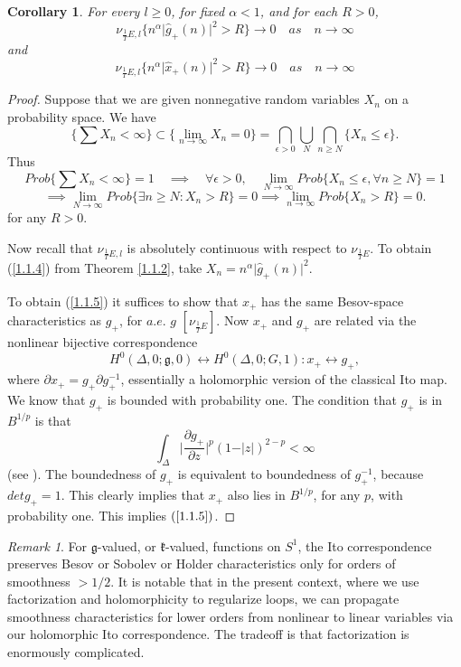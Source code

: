 \documentclass{amsart}
\newtheorem{corollary}{Corollary}
\theoremstyle{conjecture}
\theoremstyle{definition}
\theoremstyle{question}
\theoremstyle{questions}
\theoremstyle{remark}
\newtheorem*{remark}{Remark}
\theoremstyle{remarks}
\theoremstyle{example}
\numberwithin{equation}{section}
\begin{document}
\begin{corollary}\label{1.1.3} For every $l\ge 0$, for fixed
$\alpha <1$, and for each $R>0$,
\begin{equation}\label{1.1.4}\nu_{\frac 1T E ,l}\{n^{\alpha}\vert\hat {g}_{+}(n)\vert^2>R\}\to 0\quad
as\quad n\to\infty \end{equation}
and
\begin{equation}\label{1.1.5}\nu_{\frac 1T E ,l}\{n^{\alpha}\vert\hat {x}_{+}(n)\vert^2>R\}\to 0\quad
as\quad n\to\infty \end{equation}
\end{corollary}

\begin{proof}  Suppose that we are given
nonnegative random variables $X_n$ on a probability space.
We have
$$\{\sum X_n<\infty \}\subset \{\lim_{n\to\infty}X_n=0\}=\bigcap_{
\epsilon >0}\bigcup_N\bigcap_{n\ge N}\{X_n\le\epsilon \}.$$
Thus
$$Prob\{\sum X_n<\infty \}=1\quad\implies\quad\forall\epsilon >0,
\quad\lim_{N\to\infty}Prob\{X_n\le\epsilon ,\forall n\ge N\}=1$$
$$\implies\lim_{N\to\infty}Prob\{\exists n\ge N:X_n>R\}=0\implies\lim_{
n\to\infty}Prob\{X_n>R\}=0.$$
for any $R>0$.

Now recall that $\nu_{\frac 1T E ,l}$ is absolutely continuous with
respect to $\nu_{\frac 1T E}$.  To obtain (\ref{1.1.4}) from Theorem \ref{1.1.2}, take
$X_n=n^{\alpha}\vert\hat {g}_{+}(n)\vert^2$.

To obtain (\ref{1.1.5}) it suffices to show that $x_{+}$ has the same
Besov-space characteristics as $g_{+}$, for $a.e.$ $g$ $[\nu_{\frac 1T E}]$.
Now $x_{+}$ and $g_{+}$ are related via the nonlinear bijective
correspondence
$$H^0(\Delta ,0;\mathfrak g,0)\leftrightarrow H^0(\Delta ,0;G,1):x_{+}
\leftrightarrow g_{+},$$
where $\partial x_{+}=g_{+}\partial g_{+}^{-1}$, essentially a holomorphic version of
the classical Ito map.  We know that $g_{+}$ is bounded with
probability one.  The condition that $g_{+}$ is in $B^{1/p}$ is that
$$\int_{\Delta}\vert\frac {\partial g_{+}}{\partial z}\vert^p(1-\vert
z\vert )^{2-p}<\infty$$
(see \cite{Peller}).  The boundedness of $g_{+}$ is equivalent to
boundedness of $g_{+}^{-1}$, because $detg_{+}=1$.  This clearly
implies that $x_{+}$ also lies in $B^{1/p}$, for any $p$, with
probability one.  This implies $(\ref{1.1.5})$. \end{proof}

\begin{remark}  For $\mathfrak g$-valued, or $\mathfrak k$-valued, functions on
$S^1$, the Ito correspondence preserves Besov or Sobolev or
Holder characteristics only for orders of smoothness
$>1/2$.  It is notable that in the present context, where
we use factorization and holomorphicity to regularize
loops, we can propagate smoothness characteristics for
lower orders from nonlinear to linear variables via our
holomorphic Ito correspondence.  The tradeoff is that
factorization is enormously complicated.\end{remark}
\end{document}
